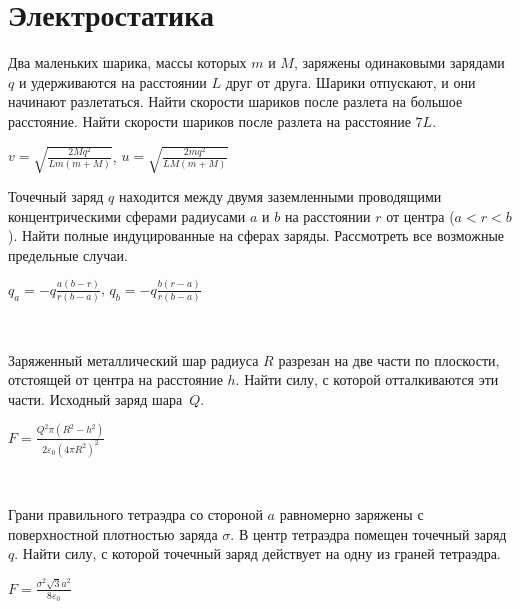 \section{Электростатика}

\begin{ex}
Два маленьких шарика, массы которых $m$ и $M$, заряжены одинаковыми зарядами $q$ и удерживаются на расстоянии $L$ друг от друга. Шарики отпускают, и они начинают разлетаться. Найти скорости шариков после разлета на большое расстояние. Найти скорости шариков после разлета на расстояние $7L$.
\begin{ans}
$v = \sqrt{\frac{2Mq^2}{Lm(m+M)}}$, $u = \sqrt{\frac{2mq^2}{LM(m+M)}}$
\end{ans}
\end{ex}

\begin{ex}
Точечный заряд $q$ находится между двумя заземленными проводящими концентрическими сферами 
радиусами $a$ и $b$ на расстоянии $r$ от центра ($a<r<b$). 
Найти полные индуцированные на сферах заряды. Рассмотреть все возможные предельные случаи.
\begin{ans}
$q_a = -q\frac{a(b-r)}{r(b-a)}$, $q_b = -q\frac{b(r-a)}{r(b-a)}$
\end{ans}
\end{ex}

\begin{ex}
\hspace{0pt} \\
\begin{minipage}{.65\textwidth}
Заряженный металлический шар радиуса $R$ разрезан на две части по плоскости, отстоящей от центра на расстояние $h$. 
Найти силу, с которой отталкиваются эти части. Исходный заряд шара~$Q$.
\end{minipage}
\begin{minipage}{.35\textwidth}
\centering

\end{minipage}
\begin{ans}
$F = \frac{Q^2 \pi (R^2-h^2)}{2 \varepsilon_0 {(4 \pi R^2)}^2}$
\end{ans}
\end{ex}

\begin{ex}
\hspace{0pt} \\
\begin{minipage}{.65\textwidth}
Грани правильного тетраэдра со стороной $a$ равномерно заряжены с поверхностной плотностью заряда $\sigma$. 
В центр тетраэдра помещен точечный заряд $q$. Найти силу, с которой точечный заряд действует на одну из граней тетраэдра.
\end{minipage}
\begin{minipage}{.35\textwidth}
\centering

\end{minipage}
\begin{ans}
$F = \frac{\sigma^2 \sqrt{3}a^2}{8\varepsilon_0}$
\end{ans}
\end{ex}


